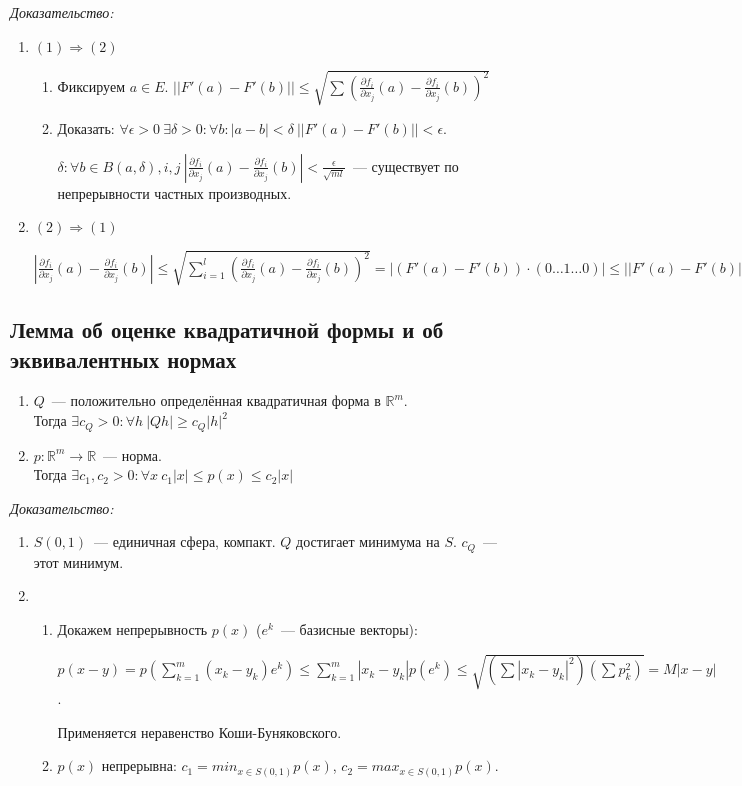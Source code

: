 \documentclass[paper=a4, fontsize=11pt]{article}
\begin{document}
\emph{Доказательство:}
\begin{enumerate}
    \item $(1) \Rightarrow (2)$
    \begin{enumerate}
        \item Фиксируем $a\in E$.
        $||F'(a) - F'(b)|| \leq \sqrt{\sum(\frac{\partial f_i}{\partial x_j}(a)-\frac{\partial f_i}{\partial x_j}(b))^2}$
        \item Доказать: $\forall \epsilon > 0\ \exists \delta > 0: \forall b: |a-b|<\delta\ ||F'(a)-F'(b)||<\epsilon$.

        $\delta: \forall b \in B(a,\delta),i,j\ |\frac{\partial f_i}{\partial x_j}(a)-\frac{\partial f_i}{\partial x_j}(b)| <
        \frac{\epsilon}{\sqrt{ml}}$~--- существует по непрерывности частных производных.
    \end{enumerate}
    \item $(2) \Rightarrow (1)$

    $|\frac{\partial f_i}{\partial x_j}(a)-\frac{\partial f_i}{\partial x_j}(b)| \leq
    \sqrt{\sum_{i=1}^{l}(\frac{\partial f_i}{\partial x_j}(a)-\frac{\partial f_i}{\partial x_j}(b))^2} =
    |(F'(a)-F'(b)) \cdot (0 \dots 1 \dots 0)| \leq ||F'(a) - F'(b)||$
\end{enumerate}

\subsection{Лемма об оценке квадратичной формы и об эквивалентных нормах}
\begin{enumerate}
    \item $Q$~--- положительно определённая квадратичная форма в $\mathds{R}^m$.\\
    Тогда $\exists c_Q > 0: \forall h\ |Qh| \geq c_Q|h|^2$
    \item $p: \mathds{R}^m \rightarrow \mathds{R}$~--- норма.\\
    Тогда $\exists c_1,c_2 > 0: \forall x\ c_1|x| \leq p(x) \leq c_2|x|$
\end{enumerate}

\emph{Доказательство:}
\begin{enumerate}
    \item $S(0,1)$~--- единичная сфера, компакт. $Q$ достигает минимума на $S$. $c_Q$~--- этот минимум.
    \item 
    \begin{enumerate}
        \item Докажем непрерывность $p(x)$ ($e^k$~--- базисные векторы):

        $p(x-y) = p(\sum_{k=1}^m (x_k-y_k)e^k) \leq \sum_{k=1}^m |x_k-y_k|p(e^k) \leq \sqrt{(\sum|x_k-y_k|^2)(\sum p_k^2)} = M|x-y|$.
        
        Применяется неравенство Коши-Буняковского.
        \item $p(x)$ непрерывна: $c_1 = min_{x \in S(0,1)} p(x)$, $c_2 = max_{x \in S(0,1)} p(x)$.
    \end{enumerate}
\end{enumerate}
\end{document}
